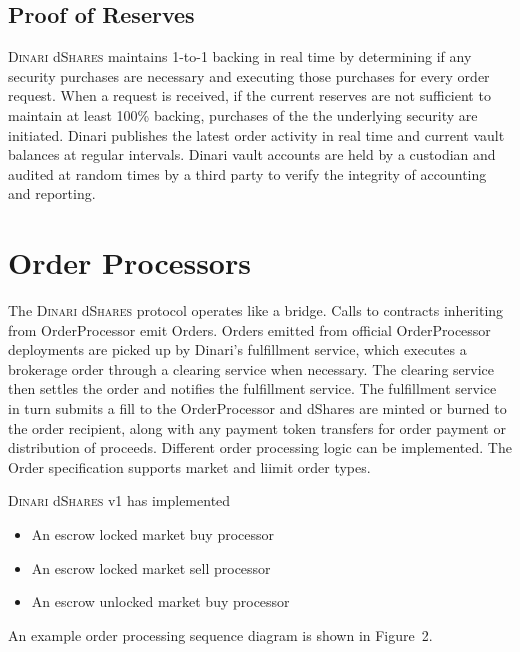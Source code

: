 \documentclass[sigconf,nonacm,prologue,table]{acmart}
\newcommand{\dshares}{\textsc{Dinari} d\textsc{Shares} }
\begin{document}
\subsection{Proof of Reserves}

\dshares maintains 1-to-1 backing in real time by determining if any security purchases are necessary and executing those purchases for every order request. When a request is received, if the current reserves are not sufficient to maintain at least 100\% backing, purchases of the the underlying security are initiated. Dinari publishes the latest order activity in real time and current vault balances at regular intervals. Dinari vault accounts are held by a custodian and audited at random times by a third party to verify the integrity of accounting and reporting. 

\section{Order Processors}
\label{sec:Processors}

The \dshares protocol operates like a bridge. Calls to contracts inheriting from OrderProcessor emit Orders. Orders emitted from official OrderProcessor deployments are picked up by Dinari's fulfillment service, which executes a brokerage order through a clearing service when necessary. The clearing service then settles the order and notifies the fulfillment service. The fulfillment service in turn submits a fill to the OrderProcessor and dShares are minted or burned to the order recipient, along with any payment token transfers for order payment or distribution of proceeds. Different order processing logic can be implemented. The Order specification supports market and liimit order types.

\dshares v1 has implemented
\begin{itemize}
    \item An escrow locked market buy processor
    \item An escrow locked market sell processor
    \item An escrow unlocked market buy processor
\end{itemize}

An example order processing sequence diagram is shown in Figure~2.
\end{document}
